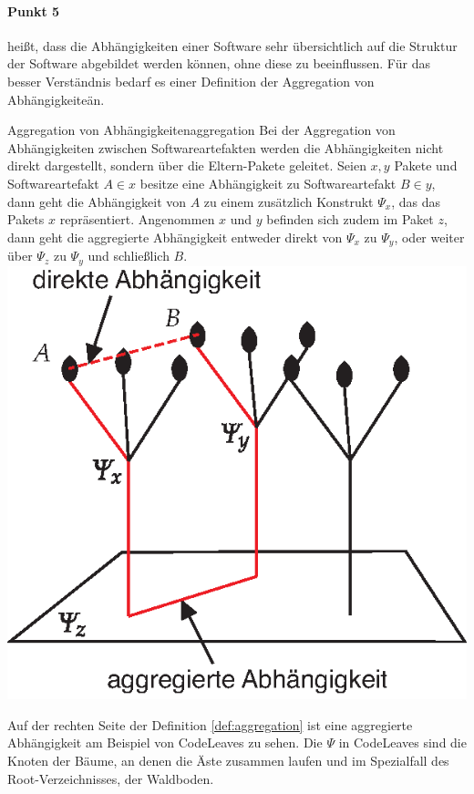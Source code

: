 \paragraph{Punkt 5} heißt, dass die Abhängigkeiten einer Software sehr übersichtlich auf die Struktur der Software abgebildet werden können, ohne diese zu beeinflussen. Für das besser Verständnis bedarf es einer Definition der Aggregation von Abhängigkeiteän.

\begin{splitbox}{Aggregation von Abhängigkeiten}{aggregation}
Bei der Aggregation von Abhängigkeiten zwischen Softwareartefakten werden die Abhängigkeiten nicht direkt dargestellt, sondern über die Eltern-Pakete geleitet. Seien $x, y$ Pakete und Softwareartefakt $A \in x$ besitze eine Abhängigkeit zu Softwareartefakt $B \in y$, dann geht die Abhängigkeit von $A$ zu einem zusätzlich Konstrukt $\Psi_x$, das das Pakets $x$ repräsentiert. Angenommen $x$ und $y$ befinden sich zudem im Paket $z$, dann geht die aggregierte Abhängigkeit entweder direkt von $\Psi_x$ zu $\Psi_y$, oder weiter über $\Psi_z$ zu $\Psi_y$ und schließlich $B$.
\tcblower
\includegraphics[width=\linewidth]{figures/aggregation}
\end{splitbox}

Auf der rechten Seite der Definition \ref{def:aggregation} ist eine aggregierte Abhängigkeit am Beispiel von CodeLeaves zu sehen. Die $\Psi$ in CodeLeaves sind die Knoten der Bäume, an denen die Äste zusammen laufen und im Spezialfall des Root-Verzeichnisses, der Waldboden.

